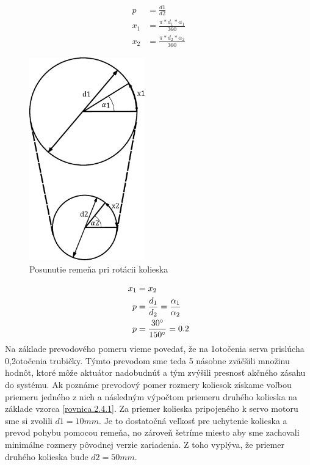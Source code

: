 \begin{align}
	\label{rovnica.2.4.1}
	p &= \frac{d1}{d2} \\
	x_1&=\frac{\pi*d_1*\alpha_1}{360} \\
	x_2&=\frac{\pi*d_2*\alpha_2}{360}
\end{align}

\begin{figure}[!h]
	\centering
	\includegraphics[width=50mm]{obr/prevod.eps}
	\caption{Posunutie remeňa pri rotácii kolieska}\label{OBRAZOK 2.4.1} 
\end{figure} 

\begin{align}
	\label{rovnica.2.4.2}
		x_1 &= x_2 \\
	p &=\frac{d_1}{d_2}=\frac{\alpha_1}{\alpha_2} \\
	p &=\frac{30\degree}{150\degree}=0.2
\end{align}
Na základe prevodového pomeru vieme povedať, že na 1\textdegree otočenia serva prislúcha 0,2\textdegree otočenia trubičky. Týmto prevodom sme teda 5 násobne zväčšili množinu hodnôt, ktoré môže aktuátor nadobudnúť a tým zvýšili presnosť akčného zásahu do systému. 
Ak poznáme prevodový pomer rozmery koliesok získame voľbou priemeru jedného z nich a následným výpočtom priemeru druhého kolieska na základe vzorca \ref{rovnica.2.4.1}. Za priemer kolieska pripojeného k servo motoru sme si zvolili $d1 = 10 mm$. Je to dostatočná veľkosť pre uchytenie kolieska a prevod pohybu pomocou remeňa, no zároveň šetríme miesto aby sme zachovali minimálne rozmery pôvodnej verzie zariadenia. Z toho vyplýva, že priemer druhého kolieska bude $d2 = 50 mm$.  





